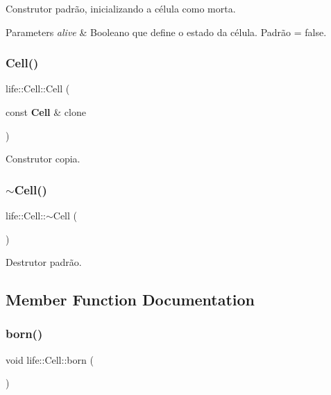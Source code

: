 Construtor padrão, inicializando a célula como morta. 
\begin{DoxyParams}{Parameters}
{\em alive} & Booleano que define o estado da célula. Padrão = false. \\
\hline
\end{DoxyParams}
\mbox{\label{classlife_1_1_cell_aa47ada7e79eacb69220f6a34f28aa1b8}} 
\subsubsection{Cell()\hspace{0.1cm}{\footnotesize\ttfamily [2/2]}}
{\footnotesize\ttfamily life\+::\+Cell\+::\+Cell (\begin{DoxyParamCaption}\item[{const \textbf{ Cell} \&}]{clone }\end{DoxyParamCaption})\hspace{0.3cm}{\ttfamily [inline]}}

Construtor copia. \mbox{\label{classlife_1_1_cell_ab76efa32046ec61a166c6f3f5149d9eb}} 
\subsubsection{$\sim$\+Cell()}
{\footnotesize\ttfamily life\+::\+Cell\+::$\sim$\+Cell (\begin{DoxyParamCaption}{ }\end{DoxyParamCaption})\hspace{0.3cm}{\ttfamily [default]}}

Destrutor padrão. 

\subsection{Member Function Documentation}
\mbox{\label{classlife_1_1_cell_aab0dd5c1038bbe0be1d89b48e31ca4b1}} 
\subsubsection{born()}
{\footnotesize\ttfamily void life\+::\+Cell\+::born (\begin{DoxyParamCaption}{ }\end{DoxyParamCaption})\hspace{0.3cm}{\ttfamily [inline]}}


